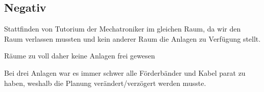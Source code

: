 \documentclass[a4paper, 11pt]{article}
\begin{document}
\subsection{Negativ}
\begin{compactenum}[$\bullet$]
\item Stattfinden von Tutorium der Mechatroniker im gleichen Raum, da wir den Raum verlassen mussten und kein anderer Raum die Anlagen zu Verfügung stellt.
\medskip
\item Räume zu voll daher keine Anlagen frei gewesen
\medskip
\item Bei drei Anlagen war es immer schwer alle Förderbänder und Kabel parat zu haben, weshalb die Planung verändert/verzögert werden musste.
\end{compactenum}
\end{document}
